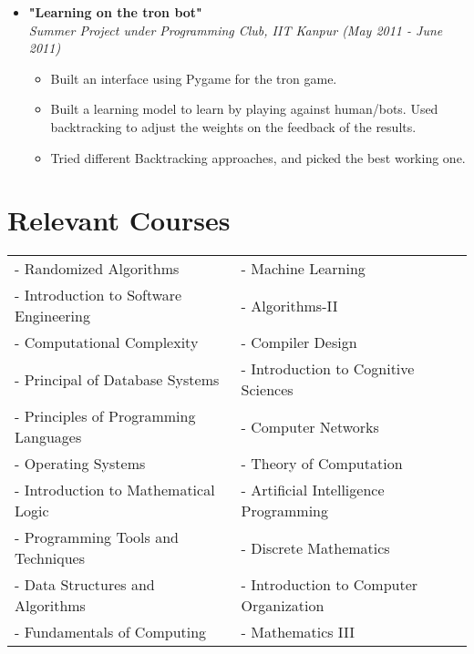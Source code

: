 \documentclass[margin,line]{resume}
\begin{document}
\begin{resume}
\begin{itemize}
  \item \large{\textbf{\textsf{"Learning on the tron bot"}}}
    \\ \small{\textit{Summer Project under Programming Club, IIT Kanpur (May 2011 - June 2011)}}
    \normalsize
    \begin{itemize}
    \item Built an interface using Pygame for the tron game.
    \item Built a learning model to learn by playing against human/bots. Used backtracking to adjust the weights on the feedback of the results.
    \item Tried different Backtracking approaches, and picked the best working one.
    \end{itemize}
    
  \end{itemize}




  \section{\mysidestyle Relevant Courses}

  \begin{tabular}{@{}p{6cm}p{6.5cm}}
    - Randomized Algorithms & - Machine Learning \\
    - Introduction to Software Engineering & - Algorithms-II \\
    - Computational Complexity &- Compiler Design \\
    - Principal of Database Systems &- Introduction to Cognitive Sciences \\
    - Principles of Programming Languages &- Computer Networks \\
    - Operating Systems &- Theory of Computation \\
    - Introduction to Mathematical Logic &- Artificial Intelligence Programming \\
    - Programming Tools and Techniques &- Discrete Mathematics \\
    - Data Structures and Algorithms & - Introduction to Computer Organization \\
    - Fundamentals of Computing &- Mathematics III
  \end{tabular}



\end{resume}
\end{document}
